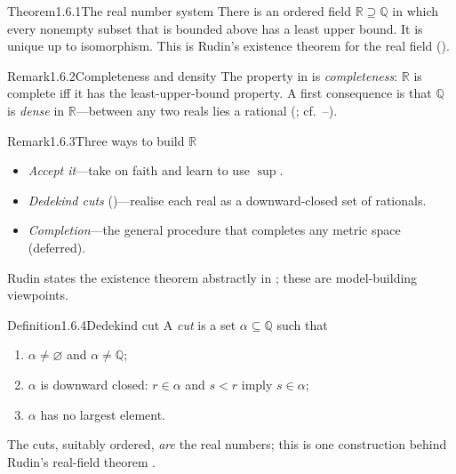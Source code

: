 \documentclass[main.tex]{subfiles}
\begin{document}
\begin{Obj}{Theorem}{1.6.1}{The real number system}
There is an ordered field $\mathbb R\supseteq\mathbb Q$ in which every nonempty subset that is
bounded above has a least upper bound. It is unique up to isomorphism.
This is Rudin's existence theorem for the real field ().
\end{Obj}

\begin{ObjL}{Remark}{1.6.2}{Completeness and density}
The property in  is \emph{completeness}: $\mathbb R$ is complete iff it has the
least-upper-bound property. A first consequence is that $\mathbb Q$ is \emph{dense} in
$\mathbb R$---between any two reals lies a rational (; cf.\ --).
\end{ObjL}

\begin{ObjL}{Remark}{1.6.3}{Three ways to build $\mathbb R$}
\begin{itemize}[leftmargin=1.3em,topsep=2pt,itemsep=1pt,label=\textbullet]
  \item \emph{Accept it}---take  on faith and learn to use $\sup$.
  \item \emph{Dedekind cuts} ()---realise each real as a downward-closed set of rationals.
  \item \emph{Completion}---the general procedure that completes any metric space (deferred).
\end{itemize}
Rudin states the existence theorem abstractly in ; these are model-building viewpoints.
\end{ObjL}

\begin{Obj}{Definition}{1.6.4}{Dedekind cut}
A \emph{cut} is a set $\alpha\subseteq\mathbb Q$ such that
\begin{enumerate}[label=\textup{(\arabic*)},leftmargin=2em,topsep=2pt,itemsep=2pt]
  \item $\alpha\neq\varnothing$ and $\alpha\neq\mathbb Q$;
  \item $\alpha$ is downward closed: $r\in\alpha$ and $s<r$ imply $s\in\alpha$;
  \item $\alpha$ has no largest element.
\end{enumerate}
The cuts, suitably ordered, \emph{are} the real numbers; this is one construction behind
Rudin's real-field theorem .
\end{Obj}
\end{document}

